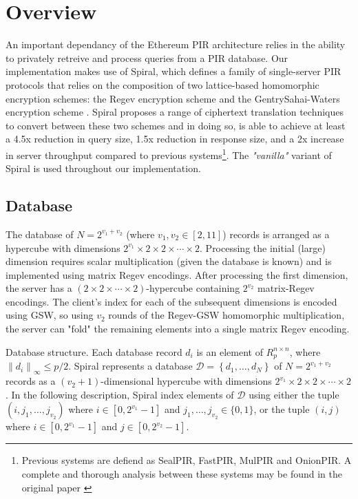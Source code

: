 \section{Overview}

An important dependancy of the Ethereum PIR architecture relies in the ability to
privately retreive and process queries from a PIR database. Our implementation makes use
of Spiral, which defines a family of single-server PIR protocols that relies on the
composition of two lattice-based homomorphic encryption schemes: the Regev encryption
scheme and the GentrySahai-Waters encryption scheme \cite{1}. Spiral proposes a range of
ciphertext translation techniques to convert between these two schemes and in doing so, is
able to achieve at least a 4.5x reduction in query size, 1.5x reduction in response size,
and a 2x increase in server throughput compared to previous systems\footnote{Previous
systems are defiend as SealPIR, FastPIR, MulPIR and OnionPIR. A complete and thorough
analysis between these systems may be found in the original paper \cite{1}}. The
\textit{"vanilla"} variant of Spiral is used throughout our implementation.

\subsection{Database}

The database of $N=2^{v_{1}+v_{2}}$ (where $v_{1}, v_{2} \in[2,11]$) records is arranged
as a hypercube with dimensions $2^{v_{1}} \times 2 \times 2 \times \cdots \times 2$.
Processing the initial (large) dimension requires scalar multiplication (given the
database is known) and is implemented using matrix Regev encodings. After processing the
first dimension, the server has a $(2 \times 2 \times \cdots \times 2)$-hypercube
containing $2^{v_{2}}$ matrix-Regev encodings. The client's index for each of the
subsequent dimensions is encoded using GSW, so using $v_{2}$ rounds of the Regev-GSW
homomorphic multiplication, the server can "fold" the remaining elements into a single
matrix Regev encoding.

Database structure. Each database record $d_{i}$ is an element of $R_{p}^{n \times n}$,
where $\left\|d_{i}\right\|_{\infty} \leq p / 2$. Spiral represents a database
$\mathcal{D}=\left\{d_{1}, \ldots, d_{N}\right\}$ of $N=2^{v_{1}+v_{2}}$ records as a
$\left(v_{2}+1\right)$-dimensional hypercube with dimensions $2^{v_{1}} \times 2 \times 2
\times \cdots \times 2$. In the following description, Spiral index elements of
$\mathcal{D}$ using either the tuple $\left(i, j_{1}, \ldots, j_{v_{2}}\right)$ where $i
\in\left[0,2^{v_{1}}-1\right]$ and $j_{1}, \ldots, j_{v_{2}} \in\{0,1\}$, or the tuple
$(i, j)$ where $i \in\left[0,2^{v_{1}}-1\right]$ and $j \in\left[0,2^{v_{2}}-1\right]$.

